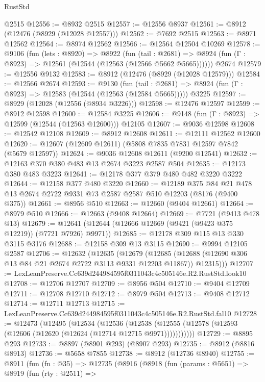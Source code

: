 \begin{lexlean}{RustStd}
\begin{coremodule}
    @2515
@12556 := @8932 @2515
@12557 := @12556 @8937
@12561 := @8912 (@12476 (@8929 (@12028 @12557)))
@12562 := @7692 @2515
@12563 := @8971 @12562
@12564 := @8974 @12562
@12566 := @12564 @12504 @10269
@12578 := @9106
    (fun (lets : @8920) =>
    @8922
      (fun (tail : @2681) =>
      @8924 (fun (Γ : @8923) => @12561 (@12544 (@12563 (@12566 @5662 @5665))))))
    @2674
@12579 := @12556 @9132
@12583 := @8912 (@12476 (@8929 (@12028 @12579)))
@12584 := @12566 @2674
@12593 := @9130
    (fun (tail : @2681) => @8924 (fun (Γ : @8923) => @12583 (@12544 (@12563 (@12584 @5665)))))
    @3225
@12597 := @8929 (@12028 (@12556 (@8934 @3226)))
@12598 := @12476 @12597
@12599 := @8912 @12598
@12600 := @12584 @3225
@12606 := @9148 (fun (Γ : @8923) => @12599 (@12544 (@12563 @12600))) @12105
@12607 := @9036 @12598
@12608 := @12542 @12108
@12609 := @8912 @12608
@12611 := @12111 @12562 @12600
@12620 := @12607 (@12609 @12611) (@5808 @7835 @7831 @12597 @7842 (@5679 @12597))
@12624 := @9036 @12608 @12611 (@9200 @12541)
@12632 := @12163 @370 @380 @483 @13 @2674 @3223 @2587 @504
@12635 := @12173 @380 @483 @3223
@12641 := @12178 @377 @379 @480 @482 @3220 @3222
@12644 := @12158 @377 @480 @3220
@12660 := @12189
    @375
    @84
    @21
    @478
    @13
    @2674
    @2722
    @9331
    @73
    @2587
    @2587
    @510
    @12203
    (@8176 (@9400 @375))
@12661 := @8956 @510
@12663 := @12660 (@9404 @12661)
@12664 := @8979 @510
@12666 := @12663 (@9408 @12664)
@12669 := @7721 (@9413 @478 @13)
@12679 := @12641 (@12644 (@12666 @12669 (@9421 (@9423 @375 @12219)) (@7721 @7926) @9971))
@12685 := @12178 @309 @115 @13 @330 @3115 @3176
@12688 := @12158 @309 @13 @3115
@12690 := @9994 @12105 @2587
@12706 := @12632
    (@12635
      (@12679
        (@12685 (@12688 (@12690 @306 @13 @84 @21 @2674 @2722 @3113 @9331 @12203 @11867)) @12315)))
@12707 := LexLeanPreserve.Cc639d244984595f0311043c4c505146e.R2.RustStd.look10
@12708 := @12706 @12707
@12709 := @8956 @504
@12710 := @9404 @12709
@12711 := @12708 @12710
@12712 := @8979 @504
@12713 := @9408 @12712
@12714 := @12711 @12713
@12715 := LexLeanPreserve.Cc639d244984595f0311043c4c505146e.R2.RustStd.fal10
@12728 := @12473
    (@12495
      (@12534
        (@12536
          (@12538 (@12555 (@12578 (@12593 (@12606 (@12620 (@12624 (@12714 @12715 @9971)))))))))))
@12729 := @8895 @293
@12733 := @8897 (@8901 @293) (@8907 @293)
@12735 := @8912 (@8816 @8913)
@12736 := @5658 @7855
@12738 := @8912 (@12736 @8940)
@12755 := @8911
    (fun (fn : @35) =>
    @12735
      (@8916
        (@8918
          (fun (params : @5651) =>
          @8919
            (fun (rty : @2511) =>

\end{coremodule}
\end{lexlean}
